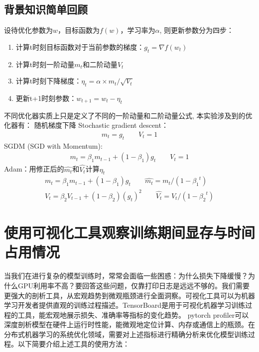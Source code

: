 \subsection{背景知识简单回顾}
设待优化参数为$w$，目标函数为$f(w)$，学习率为$\alpha$, 则更新参数分为四步：

\begin{enumerate}
    \item 计算t时刻目标函数对于当前参数的梯度：$g_t = \nabla f(w_t)$
    \item 计算t时刻一阶动量$m_t$和二阶动量$V_t$
    \item 计算t时刻下降梯度：$\eta_t = \alpha \times m_t / \sqrt{V_t}$
    \item 更新t+1时刻参数：$w_{t+1} = w_t - \eta_t$
\end{enumerate}
不同优化器实质上只是定义了不同的一阶动量和二阶动量公式, 本实验涉及到的优化器有：
随机梯度下降 Stochastic gradient descent：
\begin{align} 
m_t = g_t \qquad V_t = 1
\end{align}
SGDM (SGD with Momentum):
\begin{align}
m_t = \beta_1 m_{t-1} + (1-\beta_1) g_t \qquad V_t = 1
\end{align}
Adam：用修正后的$\hat{m_t}$和$\hat{V_t}$计算$\eta_t$
\begin{align} %
    m_t = \beta_1 m_{t-1} + (1-\beta_1) g_t  \qquad \hat{m_t} = m_t/(1-{\beta_{1} }^{t})  \\
    V_t = \beta_2 V_{t-1} + (1-\beta_2) (g_t)^2 \qquad \hat{V_t} = V_t/(1-{\beta_{2} }^{t}) 
\end{align}

\section{使用可视化工具观察训练期间显存与时间占用情况}
当我们在进行复杂的模型训练时，常常会面临一些困惑：为什么损失下降缓慢？为什么GPU利用率不高？要回答这些问题，仅靠打印日志是远远不够的。我们需要更强大的剖析工具，从宏观趋势到微观瓶颈进行全面洞察。可视化工具可以为机器学习开发者提供直观的训练过程描述。TensorBoard是用于可视化机器学习训练过程的工具，能宏观地展示损失、准确率等指标的变化趋势。
pytorch profiler可以深度剖析模型在硬件上运行时性能，能微观地定位计算、内存或通信上的瓶颈。在分布式机器学习的系统优化领域，需要对上述指标进行精确分析来优化模型训练过程。以下简要介绍上述工具的使用方法：

